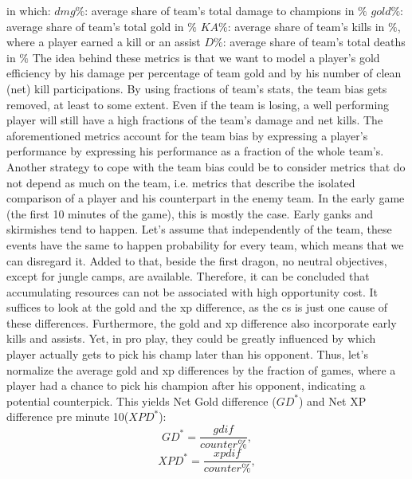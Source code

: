\documentclass{article}
\begin{document}
in which: \newline
$dmg\%$: average share of team's total damage to champions in $\%$ \newline
$gold\%$: average share of team's total gold in $\%$ \newline
$KA\%$: average share of team's kills in $\%$, where a player earned a kill or an assist \newline
$D\%$: average share of team's total deaths in $\%$
\newline \newline
The idea behind these metrics is that we want to model a player's gold efficiency by his damage per percentage of team gold and by his number of clean (net) kill participations. By using fractions of team's stats, the team bias gets removed, at least to some extent. Even if the team is losing, a well performing player will still have a high fractions of the team's damage and net kills.  \newline
The aforementioned metrics account for the team bias by expressing a player's performance by expressing his performance as a fraction of the whole team's. Another strategy to cope with the team bias could be to consider metrics that do not depend as much on the team, i.e. metrics that describe the isolated comparison of a player and his counterpart in the enemy team. In the early game (the first 10 minutes of the game), this is mostly the case. Early ganks and skirmishes tend to happen. Let's assume that independently of the team, these events have the same to  happen probability for every team, which means that we can disregard it. Added to that, beside the first dragon, no neutral objectives, except for jungle camps, are available. Therefore, it can be concluded that accumulating resources can not be associated with high opportunity cost. It suffices to look at the gold and the xp difference, as the cs is just one cause of these differences. Furthermore, the gold and xp difference also incorporate early kills and assists. Yet, in pro play, they could be greatly influenced by which player actually gets to pick his champ later than his opponent. Thus, let's normalize the average gold and xp differences by the fraction of games, where a player had a chance to pick his champion after his opponent, indicating a potential counterpick. This yields Net Gold difference ($GD^*$) and Net XP difference pre minute 10($XPD^*$):
\begin{equation}
GD^*  =  \frac{gdif}{counter \%} ,
\end{equation}
\begin{equation}
XPD^* =  \frac{xpdif}{counter \%} ,
\end{equation}
\end{document}
